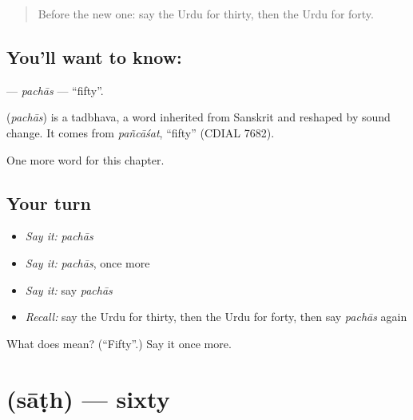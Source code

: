 \label{lesson:UR-C85-pachas}



\begin{quote}
Before the new one: say the Urdu for thirty, then the Urdu for forty.
\end{quote}

\subsection*{You'll want to know: }
\textbf{} — \emph{pachās} — \textquotedblleft{}fifty\textquotedblright{}.

\begin{cousinweb}
\textbf{} (\emph{pachās}) is a tadbhava, a word inherited from Sanskrit and reshaped by sound change. It comes from \emph{pañcāśat}, \textquotedblleft{}fifty\textquotedblright{} (CDIAL 7682).
\end{cousinweb}

\begin{grammarlens}[title={What you've built}]
One more word for this chapter.
\end{grammarlens}

\subsection*{Your turn}
\begin{itemize}
\raggedright
  \item \emph{Say it:} \emph{pachās}
  \item \emph{Say it:} \emph{pachās}, once more
  \item \emph{Say it:} say \emph{pachās}
  \item \emph{Recall:} say the Urdu for thirty, then the Urdu for forty, then say \emph{pachās} again
\end{itemize}

\begin{tcolorbox}[breakable,colback=teal!4,colframe=teal!35!black,title={Before you move on}]
What does  mean? (\textquotedblleft{}Fifty\textquotedblright{}.) Say it once more.
\end{tcolorbox}
\section[\texorpdfstring{\ur{ساٹھ} (sāṭh)}{ساٹھ (sāṭh)}]{ (sāṭh) — sixty}

\label{lesson:UR-C85-sath}



